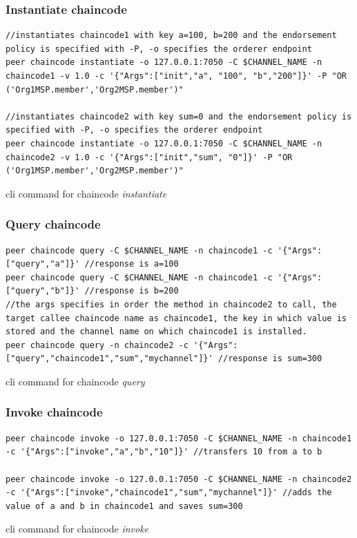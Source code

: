 \documentclass[
  a4paper,  %
  twoside,  %
  bibliography=totoc,
  headsepline,
  cleardoublepage=empty,
  parskip=half,
  draft=false
]{scrbook}
\begin{document}
\subsubsection{Instantiate chaincode}
\begin{Listing}[h!]
\begin{lstlisting}
//instantiates chaincode1 with key a=100, b=200 and the endorsement policy is specified with -P, -o specifies the orderer endpoint
peer chaincode instantiate -o 127.0.0.1:7050 -C $CHANNEL_NAME -n chaincode1 -v 1.0 -c '{"Args":["init","a", "100", "b","200"]}' -P "OR ('Org1MSP.member','Org2MSP.member')"

//instantiates chaincode2 with key sum=0 and the endorsement policy is specified with -P, -o specifies the orderer endpoint
peer chaincode instantiate -o 127.0.0.1:7050 -C $CHANNEL_NAME -n chaincode2 -v 1.0 -c '{"Args":["init","sum", "0"]}' -P "OR ('Org1MSP.member','Org2MSP.member')"
\end{lstlisting}
\caption{cli command for chaincode \textit{instantiate}}
\label{lst:cin}
\end{Listing}
\subsubsection{Query chaincode}
\begin{Listing}[h!]
\begin{lstlisting}
peer chaincode query -C $CHANNEL_NAME -n chaincode1 -c '{"Args":["query","a"]}' //response is a=100
peer chaincode query -C $CHANNEL_NAME -n chaincode1 -c '{"Args":["query","b"]}' //response is b=200
//the args specifies in order the method in chaincode2 to call, the target callee chaincode name as chaincode1, the key in which value is stored and the channel name on which chaincode1 is installed.
peer chaincode query -n chaincode2 -c '{"Args":["query","chaincode1","sum","mychannel"]}' //response is sum=300
\end{lstlisting}
\caption{cli command for chaincode \textit{query}}
\label{lst:cq}
\end{Listing}

\clearpage
\subsubsection{Invoke chaincode}
\begin{Listing}[h!]
\begin{lstlisting}
peer chaincode invoke -o 127.0.0.1:7050 -C $CHANNEL_NAME -n chaincode1 -c '{"Args":["invoke","a","b","10"]}' //transfers 10 from a to b

peer chaincode invoke -o 127.0.0.1:7050 -C $CHANNEL_NAME -n chaincode2 -c '{"Args":["invoke","chaincode1","sum","mychannel"]}' //adds the value of a and b in chaincode1 and saves sum=300
\end{lstlisting}
\caption{cli command for chaincode \textit{invoke}}
\label{lst:civ}
\end{Listing}
\end{document}
